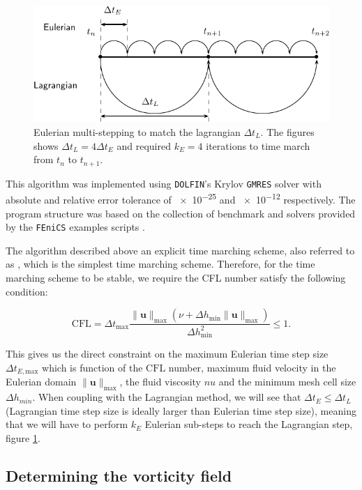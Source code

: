 	\begin{figure}[t]
	\centering
	\includegraphics[width=0.7\linewidth]{./figures/eulerian/multiStep-crop.pdf}
	\caption{Eulerian multi-stepping to match the lagrangian $\Delta t_L$. The figures shows $\Delta t_L = 4 \Delta t_E$ and required $k_E = 4$ iterations to time march from $t_n$ to $t_{n+1}$.}
	\label{fig:multiStep}
	\end{figure}
	
	
This algorithm was implemented using \texttt{DOLFIN}'s Krylov \texttt{GMRES} solver with absolute and relative error tolerance of \num{e-25} and \num{e-12} respectively. The program structure was based on the collection of benchmark and solvers provided by the \texttt{FEniCS} examples scripts \cite{nsbench}.

The algorithm described above an explicit time marching scheme, also referred to as , which is the simplest time marching scheme. Therefore, for the time marching scheme to be stable, we require the CFL number satisfy the following condition:

	\begin{equation}
	\mathrm{CFL} = \Delta t_{\mathrm{max}} \frac{\lVert\mathbf{u}\rVert_{\mathrm{max}}(\nu +  \Delta h_{\mathrm{min}}\lVert\mathbf{u}\rVert_{\mathrm{max}})}{\Delta h_{\mathrm{min}}^2} \le 1.
	\end{equation}
	
This gives us the direct constraint on the maximum Eulerian time step size $\Delta t_{E,\mathrm{max}}$ which is function of the $\mathrm{CFL}$ number, maximum fluid velocity in the Eulerian domain $\lVert \mathbf{u} \rVert_{\mathrm{max}}$, the fluid viscosity $nu$ and the minimum mesh cell size $\Delta h_{min}$. When coupling with the Lagrangian method, we will see that $\Delta t_E \le \Delta t_L$ (Lagrangian time step size is ideally larger than Eulerian time step size), meaning that we will have to perform $k_E$ Eulerian sub-steps to reach the Lagrangian step, figure \ref{fig:multiStep}.

\subsection{Determining the vorticity field}

